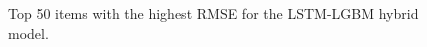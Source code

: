 \begin{figure}
    \centering
    \caption{Top 50 items with the highest RMSE for the LSTM-LGBM hybrid model.}
    \label{fig:hyb_worst}
\end{figure}